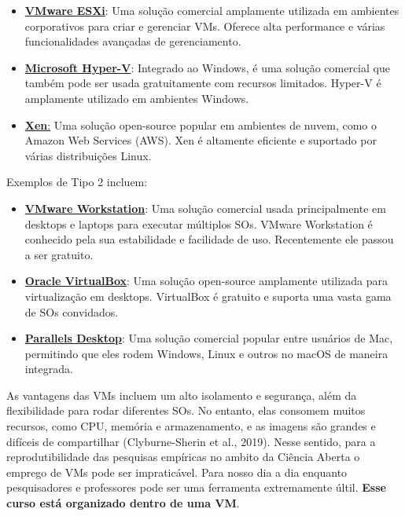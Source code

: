 \documentclass[
  a4paper,
]{book}
\begin{document}
\begin{itemize}
\item
  \href{https://www.vmware.com/products/esxi-and-esx.html.html}{\textbf{VMware
  ESXi}}: Uma solução comercial amplamente utilizada em ambientes
  corporativos para criar e gerenciar VMs. Oferece alta performance e
  várias funcionalidades avançadas de gerenciamento.
\item
  \href{https://learn.microsoft.com/pt-br/windows-server/virtualization/hyper-v/hyper-v-technology-overview}{\textbf{Microsoft
  Hyper-V}}: Integrado ao Windows, é uma solução comercial que também
  pode ser usada gratuitamente com recursos limitados. Hyper-V é
  amplamente utilizado em ambientes Windows.
\item
  \href{https://xenproject.org/}{\textbf{Xen}:} Uma solução open-source
  popular em ambientes de nuvem, como o Amazon Web Services (AWS). Xen é
  altamente eficiente e suportado por várias distribuições Linux.
\end{itemize}

Exemplos de Tipo 2 incluem:

\begin{itemize}
\item
  \href{https://www.vmware.com/products/desktop-hypervisor.html}{\textbf{VMware
  Workstation}}: Uma solução comercial usada principalmente em desktops
  e laptops para executar múltiplos SOs. VMware Workstation é conhecido
  pela sua estabilidade e facilidade de uso. Recentemente ele passou a
  ser gratuito.
\item
  \href{https://www.virtualbox.org/}{\textbf{Oracle VirtualBox}}: Uma
  solução open-source amplamente utilizada para virtualização em
  desktops. VirtualBox é gratuito e suporta uma vasta gama de SOs
  convidados.
\item
  \href{https://www.parallels.com/br/}{\textbf{Parallels Desktop}}: Uma
  solução comercial popular entre usuários de Mac, permitindo que eles
  rodem Windows, Linux e outros no macOS de maneira integrada.
\end{itemize}

As vantagens das VMs incluem um alto isolamento e segurança, além da
flexibilidade para rodar diferentes SOs. No entanto, elas consomem
muitos recursos, como CPU, memória e armazenamento, e as imagens são
grandes e difíceis de compartilhar (Clyburne-Sherin et al., 2019). Nesse
sentido, para a reprodutibilidade das pesquisas empíricas no ambito da
Ciência Aberta o emprego de VMs pode ser impraticável. Para nosso dia a
dia enquanto pesquisadores e professores pode ser uma ferramenta
extremamente últil. \textbf{Esse curso está organizado dentro de uma
VM}.
\end{document}
